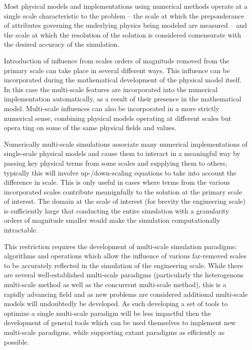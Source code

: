 Most physical models and implementations using numerical methods operate at a single scale characteristic to the problem -- the scale at which the preponderance of attributes governing the underlying physics being modeled are measured -- and the scale at which the resolution of the solution is considered comensurate with the desired accuracy of the simulation.

Introduction of influence from scales orders of magnitude removed from the primary scale can take place in several different ways. This influence can be incorporated during the mathematical development of the physical model itself. In this case the multi-scale features are incorporated into the numerical implementation automatically, as a result of their presence in the mathematical model. Multi-scale influences can also be incorporated in a more strictly numerical sense, combining physical models operating at different scales but opera ting on some of the same physical fields and values. 

Numerically multi-scale simulations associate many numerical implementations of single-scale physical models and cause them to interact in a meaningful way by passing key physical terms from some scales and supplying them to others, typically this will involve up-/down-scaling equations to take into account the difference in scale. This is only useful in cases where terms from the various incorporated scales contribute meanignfully to the solution at the primary scale of interest. The domain at the scale of interest (for brevity the engineering scale) is sufficiently large that conducting the entire simulation with a granularity orders of magnitude smaller would make the simulation computationally intractable. 

This restriction requires the development of multi-scale simulation paradigms: algorithms and operations which allow the influence of various far-removed scales to be accurately reflected in the simulation of the engineering scale. While there are several well-established multi-scale paradigms (particularly the heterogenous multi-scale method as well as the concurrent multi-scale method), this is a rapidly advancing field and as new problems are considered additional multi-scale models will undoubtedly be developed. As such developing a set of tools to optimize a single multi-scale paradigm will be less impactful then the development of general tools which can be used themselves to implement new multi-scale paradigms, while supporting extant paradigms as efficiently as possible.